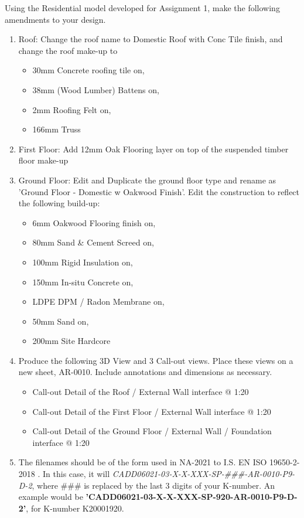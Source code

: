 Using the Residential model developed for Assignment 1, make the following amendments to your design.
\begin{enumerate}
	\item\label{itm:roof} Roof: Change the roof name to Domestic Roof with Conc Tile finish, and change the roof make-up to 
	\begin{itemize}
		\item 30mm Concrete roofing tile on,
		\item 38mm (Wood Lumber) Battens on,
		\item 2mm Roofing Felt on,
		\item 166mm Truss
	\end{itemize}
	\item\label{itm:FirstFloor} First Floor: Add 12mm Oak Flooring layer on top of the suspended timber floor make-up
	\item\label{itm:GroundFloor} Ground Floor: Edit and Duplicate the ground floor type and rename as 'Ground Floor - Domestic w Oakwood Finish'.  Edit the construction to reflect the following build-up:
	\begin{itemize}
		\item 6mm Oakwood Flooring finish on,
		\item 80mm Sand \& Cement Screed on,
		\item 100mm Rigid Insulation on,
		\item 150mm In-situ Concrete on,
		\item LDPE DPM / Radon Membrane on,
		\item 50mm Sand on,
		\item 200mm Site Hardcore
	\end{itemize}
	\item Produce the following 3D View and 3 Call-out views. Place these views on a new sheet, AR-0010.  Include annotations and dimensions as necessary.
	\begin{itemize}
		\item Call-out Detail of the Roof / External Wall interface @ 1:20
		\item Call-out Detail of the First Floor / External Wall interface @ 1:20
		\item Call-out Detail of the Ground Floor / External Wall / Foundation interface @ 1:20
	\end{itemize}
	\item The filenames should be of the form used in NA-2021 to I.S. EN ISO 19650-2-2018
	.  In this case, it will \textit{CADD06021-03-X-X-XXX-SP-\#\#\#-AR-0010-P9-D-2}, where \#\#\# is replaced by the last 3 digits of your K-number. An example would be \textbf{'CADD06021-03-X-X-XXX-SP-920-AR-0010-P9-D-2'}, for K-number K20001920.
\end{enumerate}


